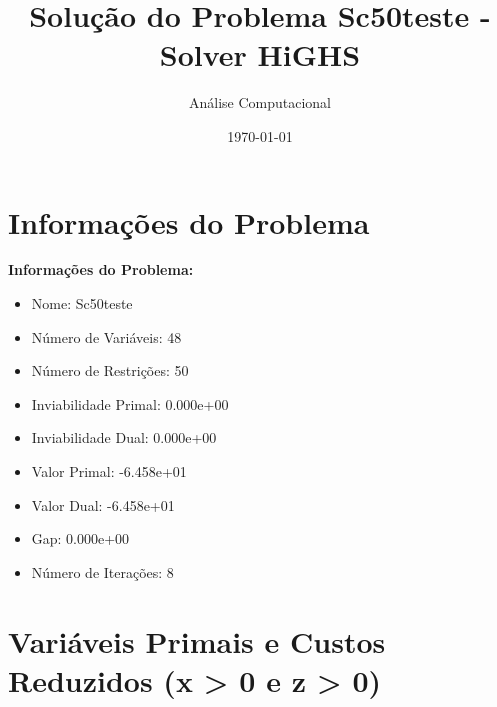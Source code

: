 \documentclass[12pt]{article}
\title{Solução do Problema Sc50teste - Solver HiGHS}
\author{Análise Computacional}
\date{\today}
\begin{document}
\maketitle

\section{Informações do Problema}

\textbf{Informações do Problema:}
\begin{itemize}
\item Nome: Sc50teste
\item Número de Variáveis: 48
\item Número de Restrições: 50
\item Inviabilidade Primal: 0.000e+00
\item Inviabilidade Dual: 0.000e+00
\item Valor Primal: -6.458e+01
\item Valor Dual: -6.458e+01
\item Gap: 0.000e+00
\item Número de Iterações: 8
\end{itemize}


\section{Variáveis Primais e Custos Reduzidos (x > 0 e z > 0)}
\end{document}
